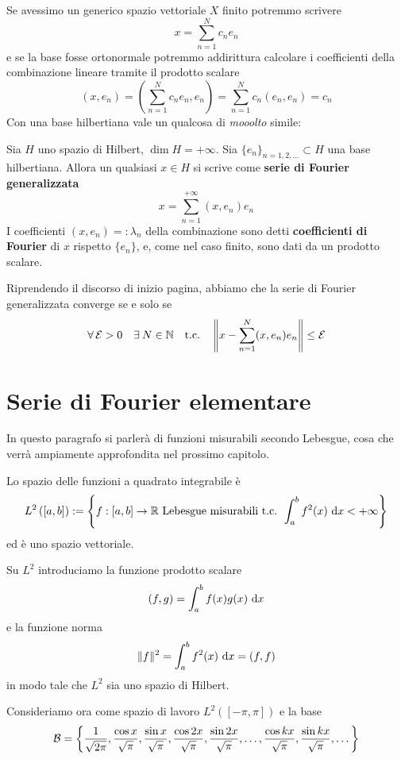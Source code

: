 Se avessimo un generico spazio vettoriale $X$ finito potremmo scrivere
$$
x=\sum_{n=1}^Nc_ne_n
$$
e se la base fosse ortonormale potremmo addirittura calcolare i coefficienti della combinazione lineare tramite il prodotto scalare
$$
(x,e_n)=\left(\sum_{n=1}^Nc_ne_n,e_n\right)=\sum_{n=1}^Nc_n(e_n,e_n)=c_n
$$
Con una base hilbertiana vale un qualcosa di \textit{mooolto} simile:
\begin{thm}
\label{teoHNOsepa}
Sia $H$ uno spazio di Hilbert, $\dim H=+\infty$. Sia $\{e_n\}_{n=1,2,\dots}\subset H$ una base hilbertiana. Allora un qualsiasi $x\in H$ si scrive come \textbf{serie di Fourier generalizzata}
\begin{equation*}
\boxed{x = \sum^{+\infty}_{n = 1}(x, e_{n}) e_{n}}
\end{equation*}
I coefficienti $(x,e_n)=:\lambda_n$ della combinazione sono detti \textbf{coefficienti di Fourier} di $x$ rispetto $\{e_n\}$, e, come nel caso finito, sono dati da un prodotto scalare.
\end{thm}

Riprendendo il discorso di inizio pagina, abbiamo che la serie di Fourier generalizzata converge se e solo se
$$
\forall\Ec>0 \quad \exists N\in \NN \quad \text{t.c.}\quad \left\|x-\sum_{n=1}^N(x,e_n)e_n\right\|\leq \Ec
$$

\newpage

\section{Serie di Fourier elementare}

In questo paragrafo si parlerà di funzioni misurabili secondo Lebesgue, cosa che verrà ampiamente approfondita nel prossimo capitolo.

\begin{defn}
Lo spazio delle funzioni a quadrato integrabile è
$$L^2\left([a,b]\right):=\left\{f:[a,b]\to\mathbb{R}\text{ Lebesgue misurabili t.c. }\displaystyle\int_a^bf^2(x)\  \mathrm{d} x<+\infty \right\}$$
ed è uno spazio vettoriale.
\end{defn}
Su $L^2$ introduciamo la funzione prodotto scalare
\begin{equation*}
(f,g)=\int_a^bf(x)g(x)\  \mathrm{d} x
\end{equation*}
e la funzione norma
\begin{equation*}
\Vert f \Vert ^2=\int_a^bf^2(x)\  \mathrm{d} x=(f,f)
\end{equation*}
in modo tale che $L^2$ sia uno spazio di Hilbert.

Consideriamo ora come spazio di lavoro $L^{2}([ - \pi, \pi])$ e la base
\begin{equation*}
\mathcal{B} = \left\{\frac{1}{\sqrt{2\pi}}, \frac{\cos x}{\sqrt{\pi}}, \frac{\sin x}{\sqrt{\pi}}, \frac{\cos2x}{\sqrt{\pi}}, \frac{\sin2x}{\sqrt{\pi}}, \dotsc, \frac{\cos kx}{\sqrt{\pi}}, \frac{\sin kx}{\sqrt{\pi}}, \dotsc  \right\}
\end{equation*}

